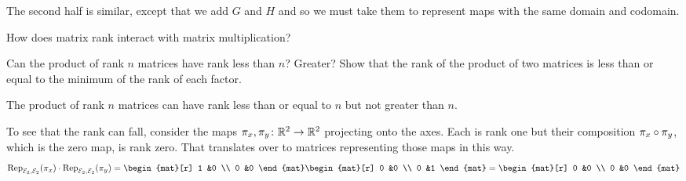 \begin{exercises}
\begin{answer}
      The second half is similar, except that we add $G$ and $H$ 
      and so we must take them to represent maps with the same domain 
      and codomain.
    \end{answer}
  \item \label{exer:RankProdLeqRankFacts}
    How does matrix rank interact with matrix multiplication?
    \begin{exparts}
      \partsitem Can the product of rank \( n \) matrices have rank less 
        than \( n \)?
        Greater?
      \partsitem  Show that the rank of the product of two matrices is less 
        than or equal to the minimum of the rank of each factor.
    \end{exparts}
    \begin{answer}
     \begin{exparts}
      \partsitem The product of rank \( n \) matrices can have rank less 
        than or equal to \( n \) but not greater than \( n \).

        To see that the rank can fall,
        consider the maps \( \mbox{$\pi_x,\pi_y\colon \mathbb{R}^2\to \mathbb{R}^2$} \) projecting onto
        the axes. 
        Each is rank one but their composition
        $\pi_x\mathbin\circ \pi_y$, which is the zero map, is rank zero.
        That translates over to matrices representing those 
        maps in this way.
        \begin{equation*}
          \rep{\pi_x}{\stdbasis_2,\stdbasis_2}\cdot\rep{\pi_y}{\stdbasis_2,\stdbasis_2}=
          \begin{mat}[r]
            1  &0  \\
            0  &0
          \end{mat}
          \begin{mat}[r]
            0  &0  \\
            0  &1
          \end{mat}=
          \begin{mat}[r]
            0  &0  \\
            0  &0
          \end{mat}
        \end{equation*}


\end{exparts}
\end{answer}
\end{exercises}
